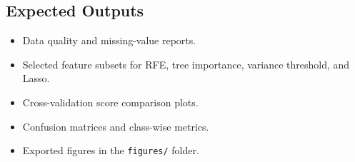 \documentclass[11pt,a4paper]{article}
\begin{document}
\subsection{Expected Outputs}
\begin{itemize}[leftmargin=*]
    \item Data quality and missing-value reports.
    \item Selected feature subsets for RFE, tree importance, variance threshold, and Lasso.
    \item Cross-validation score comparison plots.
    \item Confusion matrices and class-wise metrics.
    \item Exported figures in the \texttt{figures/} folder.
\end{itemize}
\end{document}
